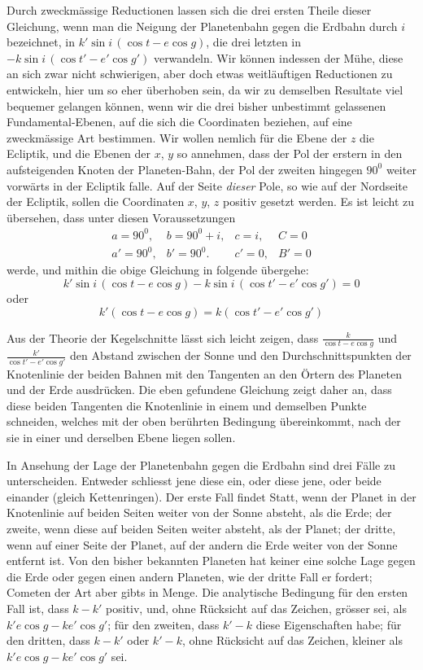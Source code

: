 Durch zweckmässige Reductionen lassen sich die drei ersten Theile dieser
Gleichung, wenn man die Neigung der Planetenbahn gegen die Erdbahn durch
$i$ bezeichnet, in $k'\sin i\,(\cos t-e\cos g)$, die drei letzten in $-k\sin i\,(\cos t'-e'\cos g')$
%
verwandeln. Wir können indessen der Mühe, diese an sich zwar nicht schwierigen,
aber doch etwas weitläuftigen Reductionen zu entwickeln, hier um so eher
überhoben sein, da wir zu demselben Resultate viel bequemer gelangen können,
wenn wir die drei bisher unbestimmt gelassenen Fundamental-Ebenen, auf die
sich die Coordinaten beziehen, auf eine zweckmässige Art bestimmen. Wir wollen
nemlich für die Ebene der $z$ die Ecliptik, und die Ebenen der $x$, $y$ so annehmen,
dass der Pol der erstern in den aufsteigenden Knoten der Planeten-Bahn,
der Pol der zweiten hingegen $90^0$ weiter vorwärts in der Ecliptik falle.
Auf der Seite \textit{dieser} Pole, so wie auf der Nordseite der Ecliptik, sollen die Coordinaten
$x$, $y$, $z$ positiv gesetzt werden. Es ist leicht zu übersehen, dass unter
diesen Voraussetzungen
\[
\begin{array}{llll}
a=90^0,&b=90^0+i,&c=i,&C=0\\
a'=90^0,&b'=90^0.&c'=0,&B'=0
\end{array}
\]
werde, und mithin die obige Gleichung in folgende übergehe:
\[
k'\sin i\,(\cos t-e\cos g)-k\sin i\,(\cos t'-e'\cos g')=0
\]
oder
\[
k'(\cos t-e\cos g)=k(\cos t'-e'\cos g')
\]

Aus der Theorie der Kegelschnitte lässt sich leicht zeigen, dass $\frac{k}{\cos t-e\cos g}$
und $\frac{k'}{\cos t'-e'\cos g'}$ den Abstand zwischen der Sonne und den Durchschnittspunkten
der Knotenlinie der beiden Bahnen mit den Tangenten an den Örtern des Planeten
und der Erde ausdrücken. Die eben gefundene Gleichung zeigt daher an,
dass diese beiden Tangenten die Knotenlinie in einem und demselben Punkte
schneiden, welches mit der oben berührten Bedingung übereinkommt, nach der
sie in einer und derselben Ebene liegen sollen.

In Ansehung der Lage der Planetenbahn gegen die Erdbahn sind drei Fälle
zu unterscheiden. Entweder schliesst jene diese ein, oder diese jene, oder beide
einander (gleich Kettenringen). Der erste Fall findet Statt, wenn der Planet in
der Knotenlinie auf beiden Seiten weiter von der Sonne absteht, als die Erde;
der zweite, wenn diese auf beiden Seiten weiter absteht, als der Planet; der
dritte, wenn auf einer Seite der Planet, auf der andern die Erde weiter von der
Sonne entfernt ist. Von den bisher bekannten Planeten hat keiner eine solche
Lage gegen die Erde oder gegen einen andern Planeten, wie der dritte Fall er%
fordert; Cometen der Art aber gibts in Menge. Die analytische Bedingung für
den ersten Fall ist, dass $k-k'$ positiv, und, ohne Rücksicht auf das Zeichen,
grösser sei, als $k'e\cos g-ke'\cos g'$; für den zweiten, dass $k'-k$ diese Eigenschaften
habe; für den dritten, dass $k-k'$ oder $k'-k$, ohne Rücksicht auf das
Zeichen, kleiner als $k'e\cos g-ke'\cos g'$ sei.

